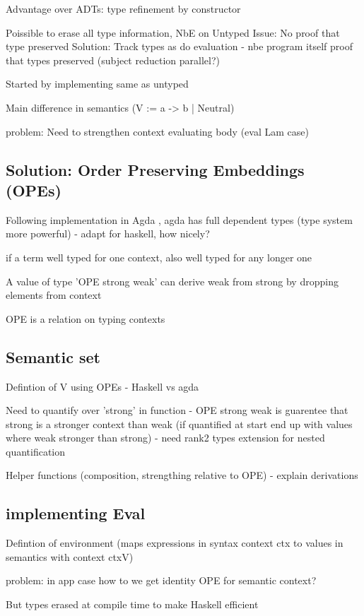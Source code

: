 Advantage over ADTs: type refinement by constructor

Poissible to erase all type information, NbE on Untyped
Issue: No proof that type preserved 
Solution: Track types as do evaluation - nbe program itself proof that types preserved (subject reduction parallel?)

Started by implementing same as untyped

Main difference in semantics (V := a -> b | Neutral) 
\cite{slides}

problem: Need to strengthen context evaluating body (eval Lam case)
\subsection{Solution: Order Preserving Embeddings (OPEs)}

Following implementation in Agda \cite{AgdaNbe}, agda has full dependent types (type system more powerful) - adapt for haskell, how nicely? 

if a term well typed for one context, also well typed for any longer one

A value of type 'OPE strong weak' can derive weak from strong by dropping elements from context

OPE is a relation on typing contexts

\subsection{Semantic set}

Defintion of V using OPEs - Haskell vs agda

Need to quantify over 'strong' in function - OPE strong weak is guarentee that strong is a stronger context than weak (if quantified at start end up with values where weak stronger than strong) - need rank2 types extension for nested quantification

Helper functions (composition, strengthing relative to OPE) - explain derivations

\subsection{implementing Eval}

Defintion of environment (maps expressions in syntax context ctx to values in semantics with context ctxV)

problem: in app case how to we get identity OPE for semantic context?

But types erased at compile time to make Haskell efficient

